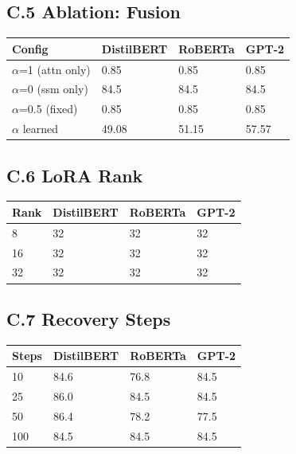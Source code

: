 \subsection{C.5 Ablation: Fusion}

\begin{table}[H]
\centering
\small
\begin{tabular}{llll}
\toprule
\textbf{Config} & \textbf{DistilBERT} & \textbf{RoBERTa} & \textbf{GPT-2} \\
\midrule
$\alpha$=1 (attn only) & 0.85 & 0.85 & 0.85 \\
$\alpha$=0 (ssm only) & 84.5 & 84.5 & 84.5 \\
$\alpha$=0.5 (fixed) & 0.85 & 0.85 & 0.85 \\
$\alpha$ learned & 49.08 & 51.15 & 57.57 \\
\bottomrule
\end{tabular}
\end{table}

\subsection{C.6 LoRA Rank}

\begin{table}[H]
\centering
\small
\begin{tabular}{llll}
\toprule
\textbf{Rank} & \textbf{DistilBERT} & \textbf{RoBERTa} & \textbf{GPT-2} \\
\midrule
8 & 32 & 32 & 32 \\
16 & 32 & 32 & 32 \\
32 & 32 & 32 & 32 \\
\bottomrule
\end{tabular}
\end{table}

\subsection{C.7 Recovery Steps}

\begin{table}[H]
\centering
\small
\begin{tabular}{llll}
\toprule
\textbf{Steps} & \textbf{DistilBERT} & \textbf{RoBERTa} & \textbf{GPT-2} \\
\midrule
10 & 84.6 & 76.8 & 84.5 \\
25 & 86.0 & 84.5 & 84.5 \\
50 & 86.4 & 78.2 & 77.5 \\
100 & 84.5 & 84.5 & 84.5 \\
\bottomrule
\end{tabular}
\end{table}

